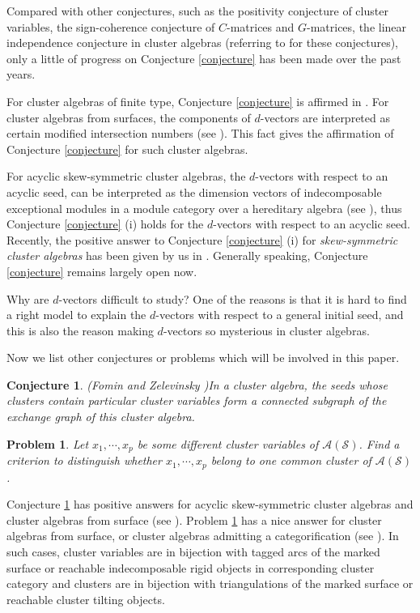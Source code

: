 \documentclass[14pt]{amsart}
\newtheorem{Conjecture}[Theorem]{Conjecture}
\newtheorem{Problem}[Theorem]{Problem}
\begin{document}
Compared with other conjectures, such as the positivity conjecture of cluster variables, the sign-coherence conjecture of $C$-matrices and $G$-matrices, the linear independence conjecture in cluster algebras (referring  to \cite{FZ,FZ3} for these conjectures),  only a little of progress on  Conjecture \ref{conjecture} has been made  over the past years.


 For cluster algebras of finite type, Conjecture \ref{conjecture} is affirmed  in \cite{CP}.
 For cluster algebras from surfaces, the components of $d$-vectors are  interpreted as certain modified intersection numbers (see \cite{FST}). This fact gives the affirmation of Conjecture \ref{conjecture} for such cluster algebras.

 For acyclic skew-symmetric cluster algebras, the $d$-vectors with respect to an acyclic seed, can be interpreted as the dimension vectors of indecomposable exceptional modules in a module category over a hereditary algebra (see \cite{CK}), thus Conjecture \ref{conjecture} (i) holds for the $d$-vectors with respect to an acyclic seed.
Recently, the positive answer to Conjecture \ref{conjecture} (i) for  {\em skew-symmetric cluster algebras} has been given  by us in \cite{CL1}. Generally speaking, Conjecture \ref{conjecture} remains largely open now.

 Why are  $d$-vectors  difficult to study? One of the reasons is that it is hard to find  a right model to explain  the $d$-vectors with respect to a general initial seed,  and this is also the reason making  $d$-vectors so mysterious in cluster algebras.

Now we list other conjectures or problems which will be involved in this paper.

\begin{Conjecture} (Fomin and Zelevinsky \cite[Conjecture 4.14(3)]{FZ2})\label{conjecture2}
In a cluster algebra, the seeds whose clusters contain particular cluster variables form a connected  subgraph of the exchange graph of this cluster algebra.
\end{Conjecture}

\begin{Problem}\label{problem}
Let $x_1,\cdots,x_p$ be some different cluster variables of $\mathcal A(\mathcal S)$. Find a criterion to distinguish
whether $x_1,\cdots,x_p$  belong to one common cluster  of $\mathcal A(\mathcal S)$.
\end{Problem}

Conjecture \ref{conjecture2} has positive answers for acyclic skew-symmetric cluster algebras and cluster algebras from surface (see \cite{CK,FST}).
 Problem \ref{problem}  has a nice answer for cluster algebras from surface, or cluster algebras admitting a categorification (see \cite{FST,CK}). In such cases, cluster variables are in bijection with tagged arcs of the marked
 surface or reachable indecomposable rigid objects in corresponding cluster category and clusters are in bijection with triangulations of the marked surface or reachable cluster tilting objects.
\end{document}
